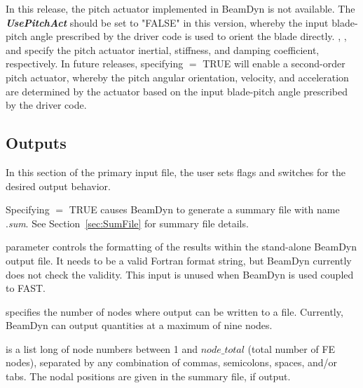 In this release, the pitch actuator implemented in BeamDyn is not available. 
The \textbf{\textit{UsePitchAct}} should be set to "FALSE" in this version, whereby the input blade-pitch angle prescribed by the driver code is used to orient the blade directly. 
, , and  specify the pitch actuator inertial, stiffness, and damping coefficient, respectively. 
In future releases, specifying  $=$ TRUE will enable a second-order pitch actuator, whereby the pitch angular orientation, velocity, and acceleration are determined by the actuator based on the input blade-pitch angle prescribed by the driver code.

\subsection{Outputs}

In this section of the primary input file, the user sets flags and switches for the desired output behavior.

Specifying  $=$ TRUE causes BeamDyn to generate a summary file with name .\textit{sum}. 
See Section~\ref{sec:SumFile} for summary file details.

 parameter controls the formatting of the results within the stand-alone BeamDyn output file. 
It needs to be a valid Fortran format string, but BeamDyn currently does not check the validity. 
This input is unused when BeamDyn is used coupled to FAST.

 specifies the number of nodes where output can be written to a file. 
Currently, BeamDyn can output quantities at a maximum of nine nodes. 

 is a list  long of node numbers between 1 and $node\_total$ (total number of FE nodes), separated by any combination of commas, semicolons, spaces, and/or tabs.   
The nodal positions are given in the summary file, if output.

